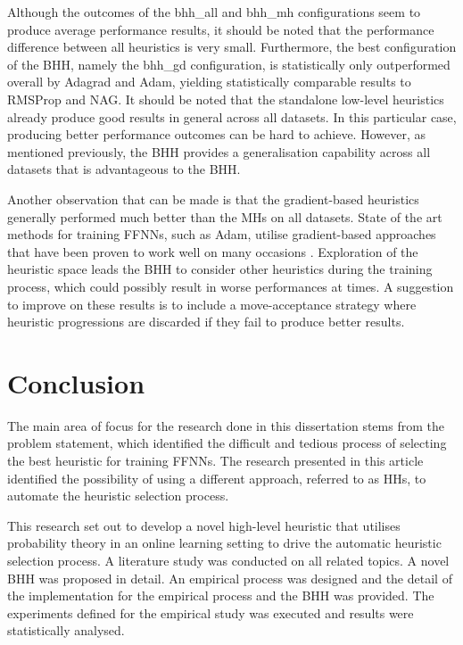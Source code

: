 \documentclass[preprint,review,12pt]{elsarticle}
\begin{document}
Although the outcomes of the bhh\_all and bhh\_mh configurations seem to produce average performance results, it should be noted that the performance difference between all heuristics is very small. Furthermore, the best configuration of the \acs{BHH}, namely the bhh\_gd configuration, is statistically only outperformed overall by \acs{Adagrad} and \acs{Adam}, yielding statistically comparable results to \acs{RMSProp} and \acs{NAG}. It should be noted that the standalone low-level heuristics already produce good results in general across all datasets. In this particular case, producing better performance outcomes can be hard to achieve. However, as mentioned previously, the \acs{BHH} provides a generalisation capability across all datasets that is advantageous to the \acs{BHH}.

Another observation that can be made is that the gradient-based heuristics generally performed much better than the \acp{MH} on all datasets. State of the art methods for training \acp{FFNN}, such as \acs{Adam}, utilise gradient-based approaches that have been proven to work well on many occasions \citep{ref:kingma:2014}. Exploration of the heuristic space leads the \acs{BHH} to consider other heuristics during the training process, which could possibly result in worse performances at times. A suggestion to improve on these results is to include a move-acceptance strategy where heuristic progressions are discarded if they fail to produce better results.


\section{Conclusion}
\label{sec:conclusion}

The main area of focus for the research done in this dissertation stems from the problem statement, which identified the difficult and tedious process of selecting the best heuristic for training \acp{FFNN}. The research presented in this article identified the possibility of using a different approach, referred to as \acp{HH}, to automate the heuristic selection process.

This research set out to develop a novel high-level heuristic that utilises probability theory in an online learning setting to drive the automatic heuristic selection process. A literature study was conducted on all related topics. A novel \acs{BHH} was proposed in detail. An empirical process was designed and the detail of the implementation for the empirical process and the \acs{BHH} was provided. The experiments defined for the empirical study was executed and results were statistically analysed.
\end{document}
